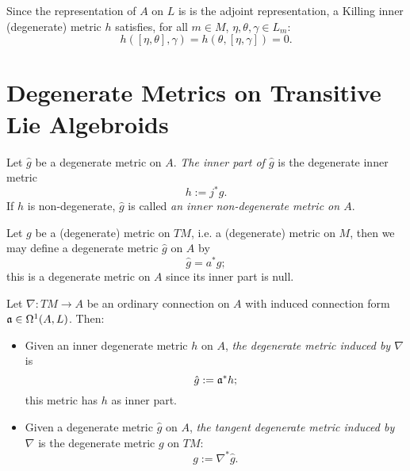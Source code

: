 Since the representation of $A$ on $L$ is is the adjoint representation, a Killing inner (degenerate) metric $h$ satisfies, for all $m \in M$, $\eta, \theta, \gamma \in L_m$:
\begin{equation}
    h([\eta, \theta], \gamma) = h(\theta, [\eta, \gamma]) = 0.
\end{equation}

\section{Degenerate Metrics on Transitive Lie Algebroids}
\label{chIntegrationSectionMetricAlgebroid}

\begin{definition}
Let $\hat g$ be a degenerate metric on $A$. \emph{The inner part of $\hat g$} is the degenerate inner metric \begin{equation}
    h := j^*g.
\end{equation} If $h$ is non-degenerate, $\hat g$ is called \emph{an inner non-degenerate metric on $A$}.
\end{definition}

Let $g$ be a (degenerate) metric on $TM$, i.e. a (degenerate) metric on $M$, then we may define a degenerate metric $\hat g$ on $A$ by
\begin{equation}
    \hat g = a^* g;
\end{equation}
this is a degenerate metric on $A$ since its inner part is null.

\begin{definition}
Let $\nabla: TM \to A$ be an ordinary connection on $A$ with induced connection form $\mathfrak{a} \in \Omega^1(A, L)$. Then:
    \begin{itemize}
    
    \item Given an inner degenerate metric $h$ on $A$, \emph{the degenerate metric induced by $\nabla$} is
    \begin{equation}
        \hat g := \mathfrak{a}^* h;
    \end{equation}
    this metric has $h$ as inner part.
    
    \item Given a degenerate metric $\hat g$ on $A$, \emph{the tangent degenerate metric induced by $\nabla$} is the degenerate metric $g$ on $TM$:
    \begin{equation}
        g := \nabla^* \hat g.
    \end{equation}
    
    \end{itemize}
\end{definition}

